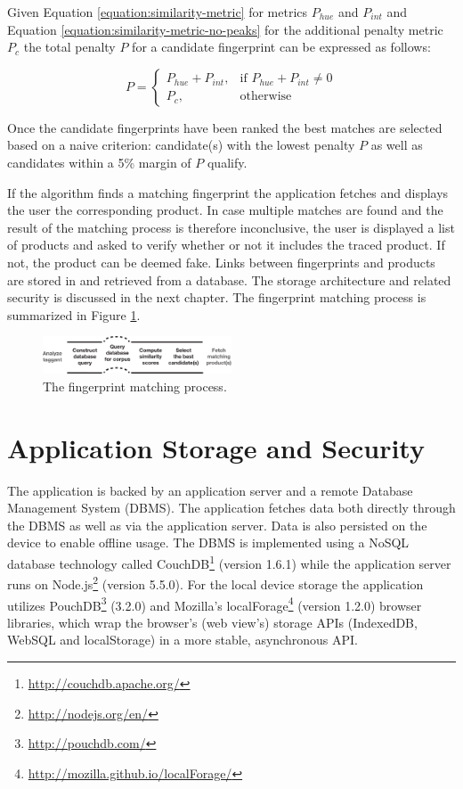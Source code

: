 \documentclass[thesis.tex]{subfiles}
\begin{document}
\noindent Given Equation \ref{equation:similarity-metric} for metrics $P_{hue}$ and $P_{int}$ and Equation \ref{equation:similarity-metric-no-peaks} for the additional penalty metric $P_c$ the total penalty $P$ for a candidate fingerprint can be expressed as follows:

\begin{equation}
	P =
	\begin{cases}
	P_{hue} + P_{int}, & \text{if } P_{hue} + P_{int} \neq 0 \\
	P_{c}, & \text{otherwise}
	\end{cases}
\end{equation}

Once the candidate fingerprints have been ranked the best matches are selected based on a naive criterion: candidate(s) with the lowest penalty $P$ as well as candidates within a 5\% margin of $P$ qualify.

If the algorithm finds a matching fingerprint the application fetches and displays the user the corresponding product. In case multiple matches are found and the result of the matching process is therefore inconclusive, the user is displayed a list of products and asked to verify whether or not it includes the traced product. If not, the product can be deemed fake. Links between fingerprints and products are stored in and retrieved from a database. The storage architecture and related security is discussed in the next chapter. The fingerprint matching process is summarized in Figure \ref{figure:matching-process}.

\begin{figure}[h]
\centering \includegraphics[width=0.5\textwidth,height=\textheight,keepaspectratio=true]{images/design_implementation/matching_process}
\caption{The fingerprint matching process.\label{figure:matching-process}}
\end{figure}

\section{Application Storage and Security}
\label{chapter:storage-security}

The application is backed by an application server and a remote Database Management System (DBMS). The application fetches data both directly through the DBMS as well as via the application server. Data is also persisted on the device to enable offline usage. The DBMS is implemented using a NoSQL database technology called CouchDB\footnote{\url{http://couchdb.apache.org/}} (version 1.6.1) while the application server runs on Node.js\footnote{\url{http://nodejs.org/en/}} (version 5.5.0). For the local device storage the application utilizes PouchDB\footnote{\url{http://pouchdb.com/}} (3.2.0) and Mozilla's localForage\footnote{\url{http://mozilla.github.io/localForage/}} (version 1.2.0) browser libraries, which wrap the browser's (web view's) storage APIs (IndexedDB, WebSQL and localStorage) in a more stable, asynchronous API.
\end{document}
